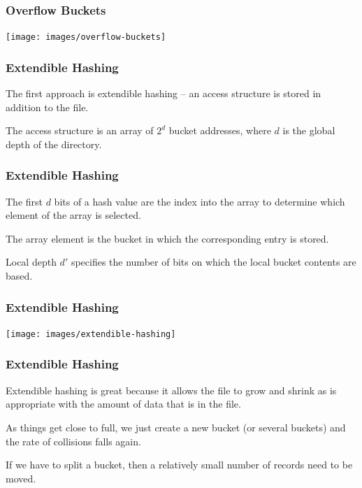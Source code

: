 \begin{frame}
\frametitle{Overflow Buckets}

\begin{center}
	\texttt{[image: images/overflow-buckets]}
\end{center}

\end{frame}

\begin{frame}
\frametitle{Extendible Hashing}

The first approach is \alert{extendible hashing} -- an access structure is stored in addition to the file. 

The access structure is an array of $2^{d}$ bucket addresses, where $d$ is the global depth of the directory.

\end{frame}

\begin{frame}
\frametitle{Extendible Hashing}

The first $d$ bits of a hash value are the index into the array to determine which element of the array is selected. 

The array element is the bucket in which the corresponding entry is stored. 

Local depth $d'$ specifies the number of bits on which the local bucket contents are based.

\end{frame}

\begin{frame}
\frametitle{Extendible Hashing}

\begin{center}
	\texttt{[image: images/extendible-hashing]}
\end{center}

\end{frame}


\begin{frame}
\frametitle{Extendible Hashing}

Extendible hashing is great because it allows the file to grow and shrink as is appropriate with the amount of data that is in the file. 

As things get close to full, we just create a new bucket (or several buckets) and the rate of collisions falls again. 

If we have to split a bucket, then a relatively small number of records need to be moved. 


\end{frame}



